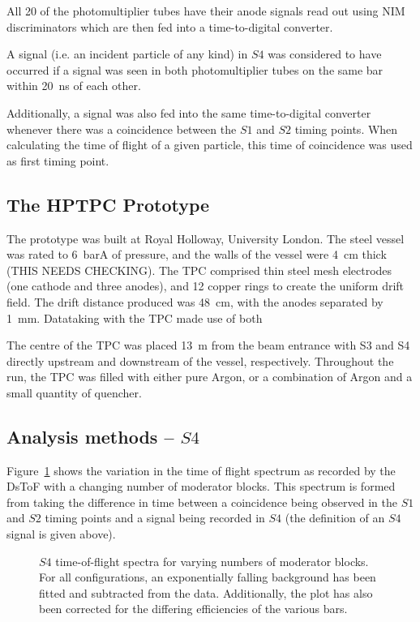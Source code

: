     All 20 of the photomultiplier tubes have their anode signals read out using NIM discriminators which are then fed into a time-to-digital converter. 
    
    A signal (i.e. an incident particle of any kind) in $S4$ was considered to have occurred if a signal was seen in both photomultiplier tubes on the same bar within 20~ns of each other.
    
    Additionally, a signal was also fed into the same time-to-digital converter whenever there was a coincidence between the $S1$ and $S2$ timing points. 
    When calculating the time of flight of a given particle, this time of coincidence was used as first timing point.
    
    \subsection{The HPTPC Prototype}
    The prototype was built at Royal Holloway, University London.
    The steel vessel was rated to 6~barA of pressure, and the walls of the vessel were 4~cm thick (THIS NEEDS CHECKING).
    The TPC comprised thin steel mesh electrodes (one cathode and three anodes), and 12 copper rings to create the uniform drift field.
    The drift distance produced was 48~cm, with the anodes separated by 1~mm.
    Datataking with the TPC made use of both 
    
    The centre of the TPC was placed 13~m from the beam entrance with S3 and S4 directly upstream and downstream of the vessel, respectively.
    Throughout the run, the TPC was filled with either pure Argon, or a combination of Argon and a small quantity of quencher.
    
	\subsection{Analysis methods -- $S4$}

	Figure~\ref{fig:s4tof} shows the variation in the time of flight spectrum as recorded by the DsToF with a changing number of moderator blocks. 
	This spectrum is formed from taking the difference in time between a coincidence being observed in the $S1$ and $S2$ timing points and a signal being recorded in $S4$ (the definition of an $S4$ signal is given above).
	
	\begin{figure}[h]
		\begin{adjustbox}{max totalsize={.8\textwidth}{.7\textheight},center}
			
		\end{adjustbox}
		\caption{$S4$ time-of-flight spectra for varying numbers of moderator blocks. For all configurations, an exponentially falling background has been fitted and subtracted from the data. Additionally, the plot has also been corrected for the differing efficiencies of the various bars.}
		\label{fig:s4tof}	
	\end{figure}

